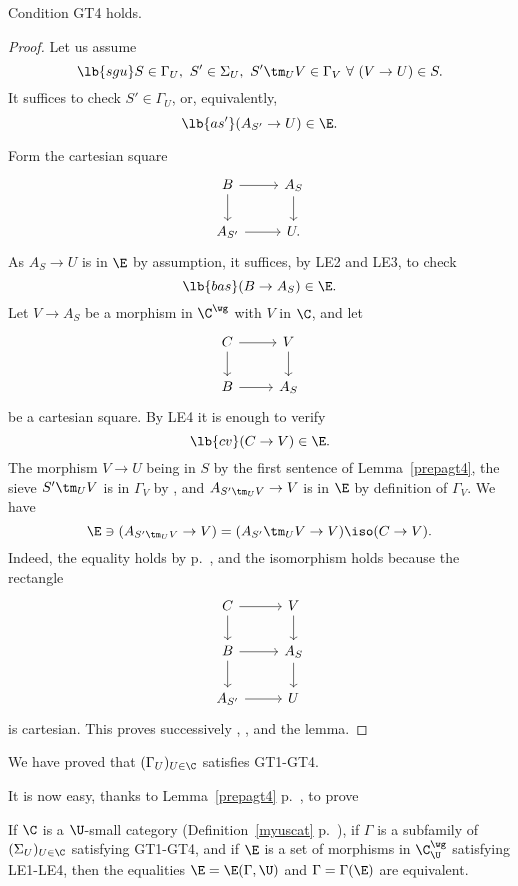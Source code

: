 \documentclass[12pt]{article}
\theoremstyle{remark}
\theoremstyle{definition}
\begin{document}
\begin{lem}
Condition GT4 holds.
\end{lem}

\begin{proof} 
Let us assume 
\begin{equation}\lb{sgu}
S\in\Gamma_U,\ S'\in\Sigma_U,\ S'\tm_UV\in\Gamma_V\ \forall\ (V\to U)\in S.
\end{equation}
It suffices to check $S'\in\Gamma_U$, or, equivalently, 
\begin{equation}\lb{as'}
(A_{S'}\to U)\in\E.
\end{equation}

Form the cartesian square 
$$
\begin{tikzcd}
B\ar{r}\ar{d}&A_S\ar{d}\\ 
A_{S'}\ar{r}&U.
\end{tikzcd}
$$ 
As $A_S\to U$ is in $\E$ by assumption, it suffices, by LE2 and LE3, to check 
\begin{equation}\lb{bas}
(B\to A_S)\in\E.
\end{equation} 
Let $V\to A_S$ be a morphism in $\C^\wg$ with $V$ in $\C$, and let 
$$
\begin{tikzcd}
C\ar{r}\ar{d}&V\ar{d}\\ 
B\ar{r}&A_S
\end{tikzcd}
$$ 
be a cartesian square. By LE4 it is enough to verify 
\begin{equation}\lb{cv}
(C\to V)\in\E.
\end{equation} 
The morphism $V\to U$ being in $S$ by the first sentence of Lemma~\ref{prepagt4}, the sieve $S'\tm_UV$ is in $\Gamma_V$ by , and $A_{S'\tm_UV}\to V$ is in $\E$ by definition of $\Gamma_V$. We have 
$$
\E\ni(A_{S'\tm_UV}\to V)=(A_{S'}\tm_UV\to V)\iso(C\to V).
$$ 
Indeed, the equality holds by  p.~, and the isomorphism holds because the rectangle 
$$
\begin{tikzcd}
C\ar{r}\ar{d}&V\ar{d}\\ 
B\ar{r}\ar{d}&A_S\ar{d}\\ 
A_{S'}\ar{r}&U
\end{tikzcd}
$$ 
is cartesian. This proves successively , ,  and the lemma.  
\end{proof}

We have proved that $(\Gamma_U)_{U\in\C}$ satisfies GT1-GT4. 

It is now easy, thanks to Lemma~\ref{prepagt4} p.~, to prove 

\begin{thm}
If $\C$ is a $\U$-small category (Definition~\ref{myuscat} p.~), if $\Gamma$ is a subfamily of $(\Sigma_U)_{U\in\C}$ satisfying GT1-GT4, and if $\E$ is a set of morphisms in $\C^\wg_\U$ satisfying LE1-LE4, then the equalities $\E=\E(\Gamma,\U)$ and $\Gamma=\Gamma(\E)$ are equivalent.
\end{thm}
\end{document}
